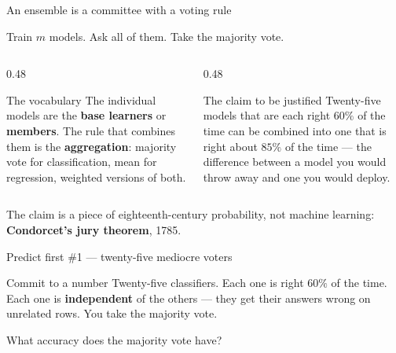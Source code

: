 \documentclass[aspectratio=169]{beamer}
\begin{document}
\begin{frame}[shrink=9]{An ensemble is a committee with a voting rule}
  \begin{exampleblock}{}
    \centering\large
    Train $m$ models. Ask all of them. Take the majority vote.
  \end{exampleblock}
  \vspace{0.3em}
  \begin{columns}[T]
    \begin{column}{0.48\textwidth}
      \begin{block}{The vocabulary}
        The individual models are the \textbf{base learners} or
        \textbf{members}. The rule that combines them is the
        \textbf{aggregation}: majority vote for classification, mean for
        regression, weighted versions of both.
      \end{block}
    \end{column}
    \begin{column}{0.48\textwidth}
      \begin{alertblock}{The claim to be justified}
        Twenty-five models that are each right $60\%$ of the time can be
        combined into one that is right about $85\%$ of the time --- the
        difference between a model you would throw away and one you would
        deploy.
      \end{alertblock}
    \end{column}
  \end{columns}
  \vspace{0.2em}
  \begin{center}\small
    The claim is a piece of eighteenth-century probability, not machine
    learning: \textbf{Condorcet's jury theorem}, 1785.
  \end{center}
\end{frame}

\begin{frame}{Predict first \#1 --- twenty-five mediocre voters}
  \begin{alertblock}{Commit to a number}
    Twenty-five classifiers. Each one is right $60\%$ of the time. Each one
    is \textbf{independent} of the others --- they get their answers wrong on
    unrelated rows. You take the majority vote.

    \medskip
    \centering\large
    What accuracy does the majority vote have?
  \end{alertblock}
\end{frame}
\end{document}
